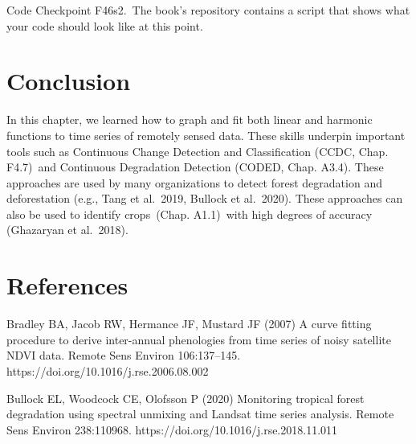 \documentclass[
  letterpaper,
  DIV=11,
  numbers=noendperiod]{scrreprt}
\begin{document}
\begin{tcolorbox}[enhanced jigsaw, left=2mm, breakable, rightrule=.15mm, opacityback=0, colframe=quarto-callout-note-color-frame, colbacktitle=quarto-callout-note-color!10!white, arc=.35mm, opacitybacktitle=0.6, toptitle=1mm, colback=white, leftrule=.75mm, title=\textcolor{quarto-callout-note-color}{\faInfo}\hspace{0.5em}{Note}, toprule=.15mm, bottomtitle=1mm, titlerule=0mm, bottomrule=.15mm, coltitle=black]

Code Checkpoint F46s2.~The book's repository contains a script that
shows what your code should look like at this point.

\end{tcolorbox}

\hypertarget{conclusion-13}{%
\section*{Conclusion}\label{conclusion-13}}


In this chapter, we learned how to graph and fit both linear and
harmonic functions to time series of remotely sensed data. These skills
underpin important tools such as Continuous Change Detection and
Classification (CCDC, Chap. F4.7)~and Continuous Degradation Detection
(CODED, Chap. A3.4). These approaches are used by many organizations to
detect forest degradation and deforestation (e.g., Tang et al.~2019,
Bullock et al.~2020). These approaches can also be used to identify
crops~(Chap. A1.1)~with high degrees of accuracy (Ghazaryan et
al.~2018).

\hypertarget{references-9}{%
\section*{References}\label{references-9}}


Bradley BA, Jacob RW, Hermance JF, Mustard JF (2007) A curve fitting
procedure to derive inter-annual phenologies from time series of noisy
satellite NDVI data. Remote Sens Environ 106:137--145.
https://doi.org/10.1016/j.rse.2006.08.002

Bullock EL, Woodcock CE, Olofsson P (2020) Monitoring tropical forest
degradation using spectral unmixing and Landsat time series analysis.
Remote Sens Environ 238:110968.
https://doi.org/10.1016/j.rse.2018.11.011
\end{document}
